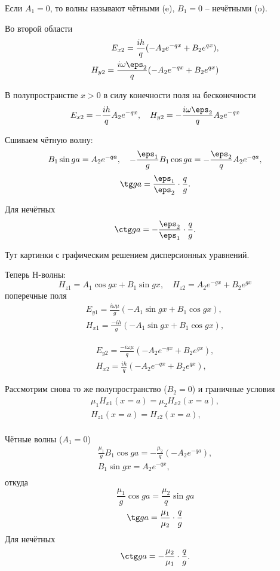 Если \(A_1 = 0\), то волны называют чётными (e), \( B_1 = 0 \) -- нечётными (o).

Во второй области
\begin{align*}
	E_{x2} = \frac{ih}{q}(-A_2 e^{-qx} + B_2 e^{qx}),\\
	H_{y2} = \frac{i\omega\eps_2}{q}(-A_2 e^{-qx} + B_2 e^{qx})\\
\end{align*}

В полупространстве \( x>0 \) в силу конечности поля на бесконечности
\[
	E_{x2} = -\frac{ih}{q} A_2 e^{-qx},\quad
	H_{y2} = -\frac{i\omega\eps_2}{q} A_2 e^{-qx}
\]

Сшиваем чётную волну:
\[
	B_1\sin ga = A_2e^{-qa},\quad -\frac{\eps_1}{g} B_1\cos ga = -\frac{\eps_2}{q} A_2 e^{-qa},
\]
\[
	\tg ga = \frac{\eps_1}{\eps_2}\cdot\frac{q}{g}.
\]

Для нечётных
\[
	\ctg ga = -\frac{\eps_2}{\eps_1}\cdot\frac{q}{g}.
\]

Тут картинки с графическим решением дисперсионных уравнений.

Теперь H-волны:
\[
	H_{z1} = A_1 \cos gx + B_1 \sin gx,\quad H_{z2} = A_2 e^{-gx} + B_2 e^{gx}
\]
поперечные поля
\begin{align*}
	E_{y1} = \frac{i\omega\mu}{g}(-A_1\sin gx + B_1\cos gx),\\
	H_{x1} = \frac{-ih}{g}(-A_1\sin gx + B_1\cos gx),
\end{align*}

\begin{align*}
	E_{y2} = \frac{-i\omega\mu}{q}(-A_2 e^{-gx} + B_2 e^{gx}),\\
	H_{x2} = \frac{ih}{q}(-A_2 e^{-qx} + B_2 e^{qx}),
\end{align*}

Рассмотрим снова то же полупространство (\( B_2 = 0 \)) и граничные условия
\begin{align*}
	\mu_1H_{x1}(x=a) = \mu_2H_{x2}(x=a),\\
	H_{z1}(x=a) = H_{z2}(x=a),\\
\end{align*}

Чётные волны (\( A_1 = 0 \))
\begin{align*}
	\frac{\mu_1}{g}B_1\cos ga = -\frac{\mu_2}{q}(-A_2 e^{-qa}),\\
	B_1 \sin gx = A_2 e^{-qx},\\
\end{align*}
откуда
\[
	\frac{\mu_1}{g}\cos ga = \frac{\mu_2}{q}\sin ga
\]
\[
	\tg ga = \frac{\mu_1}{\mu_2}\cdot\frac{q}{g}
\]
Для нечётных
\[
	\ctg ga = -\frac{\mu_2}{\mu_1}\cdot\frac{q}{g}.
\]